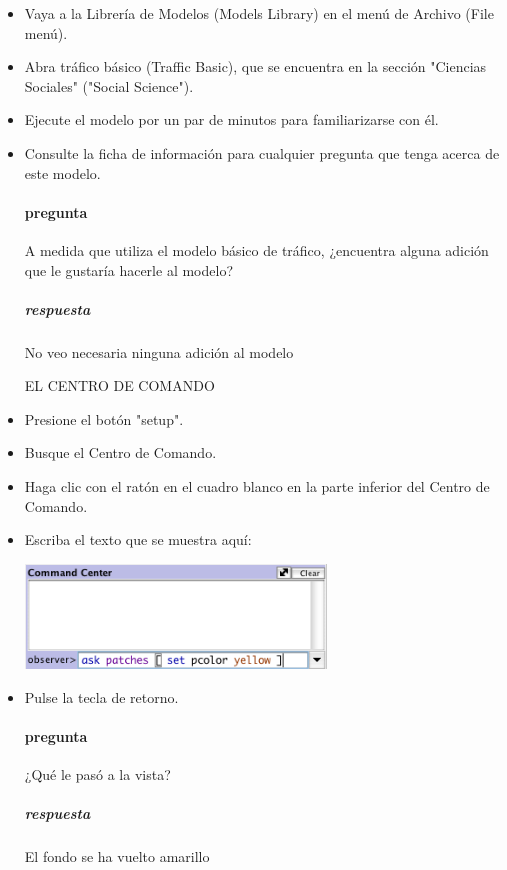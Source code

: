 \documentclass[12pt,letterpaper]{article}
\begin{document}
\begin{itemize}

\renewcommand{\labelitemi}{\scriptsize$\blacksquare$}

\item Vaya a la Librería de Modelos (Models Library) en el menú de Archivo (File menú).
\item Abra tráfico básico (Traffic Basic), que se encuentra en la sección "Ciencias Sociales" ("Social Science").
\item Ejecute el modelo por un par de minutos para familiarizarse con él.
\item Consulte la ficha de información para cualquier pregunta que tenga acerca de este modelo.

\paragraph{pregunta} A medida que utiliza el modelo básico de tráfico, ¿encuentra  alguna adición que le gustaría hacerle al modelo?
\subparagraph{respuesta} No veo necesaria ninguna adición al modelo

\begin{center}
	EL CENTRO DE COMANDO
\end{center}

\item Presione el botón "setup".
\item Busque el Centro de Comando.
\item Haga clic con el ratón en el cuadro blanco en la parte inferior del Centro de Comando.
\item Escriba el texto que se muestra aquí:

\begin{center}
	\includegraphics[width=8cm]{./imagenes/image1.png}
\end{center}

\item Pulse la tecla de retorno.

\paragraph{pregunta}¿Qué le pasó a la vista?
\subparagraph{respuesta}El fondo se ha vuelto amarillo


\end{itemize}
\end{document}
